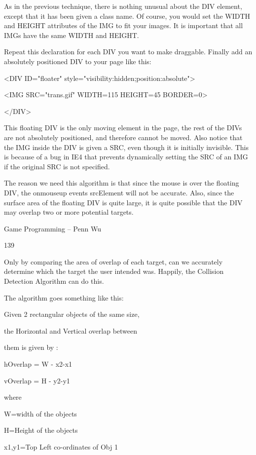 \documentclass[
]{article}
\begin{document}
As in the previous technique, there is nothing unusual about the DIV
element, except that it has been given a class name. Of course, you
would set the WIDTH and HEIGHT attributes of the IMG to fit your images.
It is important that all IMGs have the same WIDTH and HEIGHT.

Repeat this declaration for each DIV you want to make draggable. Finally
add an absolutely positioned DIV to your page like this:

\textless DIV ID="floater"
style="visibility:hidden;position:absolute"\textgreater{}

\textless IMG SRC="trans.gif" WIDTH=115 HEIGHT=45 BORDER=0\textgreater{}

\textless/DIV\textgreater{}

This floating DIV is the only moving element in the page, the rest of
the DIVs are not absolutely positioned, and therefore cannot be moved.
Also notice that the IMG inside the DIV is given a SRC, even though it
is initially invisible. This is because of a bug in IE4 that prevents
dynamically setting the SRC of an IMG if the original SRC is not
specified.

The reason we need this algorithm is that since the mouse is over the
floating DIV, the onmouseup event\textquotesingle s srcElement will not
be accurate. Also, since the surface area of the floating DIV is quite
large, it is quite possible that the DIV may overlap two or more
potential targets.

Game Programming -- Penn Wu

139

\protect\hypertarget{index_split_009.htmlux5cux23p140}{}{}Only by
comparing the area of overlap of each target, can we accurately
determine which the target the user intended was. Happily, the Collision
Detection Algorithm can do this.

The algorithm goes something like this:

Given 2 rectangular objects of the same size,

the Horizontal and Vertical overlap between

them is given by :

hOverlap = W - \textbar x2-x1\textbar{}

vOverlap = H - \textbar y2-y1\textbar{}

where

W=width of the objects

H=Height of the objects

x1,y1=Top Left co-ordinates of Obj 1
\end{document}
